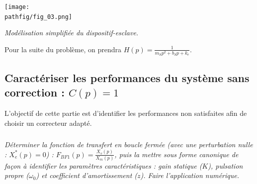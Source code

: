 \documentclass[10pt,fleqn]{article} %
\begin{document}
\begin{center}
\texttt{[image: \\pathfig/fig\_03.png]}
%
%
%

\textit{Modélisation simplifiée du dispositif-esclave.}
\end{center}

Pour la suite du problème, on prendra $ H(p)= \frac{1}{m_S p^2 +b_S p+ k_e}$.


\subsection{Caractériser les performances du système sans correction : $C(p) = 1$\\}

L'objectif de cette partie est d'identifier les performances non satisfaites afin de choisir un correcteur adapté.



\subparagraph{}\textit{Déterminer la fonction de transfert en boucle fermée (avec une perturbation nulle :
$X_e^*(p) =0$) : $F_{BF1}(p) = \frac{ X_v(p)}{ X_m(p)}$, puis la mettre sous forme canonique de façon à identifier
les paramètres caractéristiques : gain statique ($K$), pulsation propre ($\omega_0$) et coefficient d'amortissement
($z$). Faire l'application numérique.}
\end{document}
